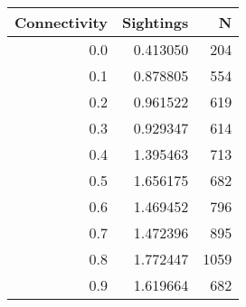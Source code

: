 \begin{tabular}{rrr}
\toprule
 Connectivity &  Sightings &    N \\
\midrule
          0.0 &   0.413050 &  204 \\
          0.1 &   0.878805 &  554 \\
          0.2 &   0.961522 &  619 \\
          0.3 &   0.929347 &  614 \\
          0.4 &   1.395463 &  713 \\
          0.5 &   1.656175 &  682 \\
          0.6 &   1.469452 &  796 \\
          0.7 &   1.472396 &  895 \\
          0.8 &   1.772447 & 1059 \\
          0.9 &   1.619664 &  682 \\
\bottomrule
\end{tabular}
